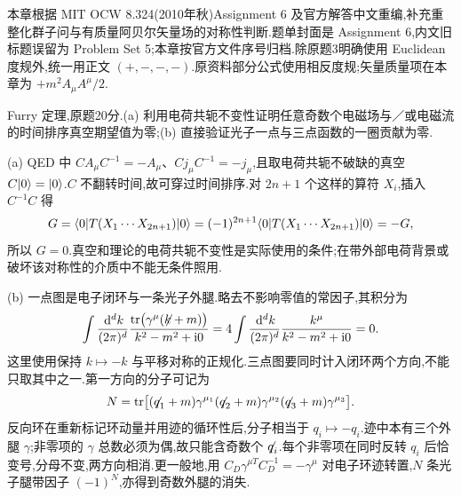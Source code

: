 本章根据 MIT OCW 8.324(2010年秋)Assignment 6 及官方解答中文重编,补充重整化群子问与有质量阿贝尔矢量场的对称性判断.题单封面是 Assignment 6,内文旧标题误留为 Problem Set 5;本章按官方文件序号归档.除原题3明确使用 Euclidean 度规外,统一用正文 $(+,-,-,-)$.原资料部分公式使用相反度规;矢量质量项在本章为 $+m^2A_\mu A^\mu/2$.

\begin{exercise}
Furry 定理,原题20分.(a) 利用电荷共轭不变性证明任意奇数个电磁场与／或电磁流的时间排序真空期望值为零;(b) 直接验证光子一点与三点函数的一圈贡献为零.
\end{exercise}
\begin{solution}
(a) QED 中 $CA_\mu C^{-1}=-A_\mu$、$Cj_\mu C^{-1}=-j_\mu$,且取电荷共轭不破缺的真空 $C\ket0=\ket0$.$C$ 不翻转时间,故可穿过时间排序.对 $2n+1$ 个这样的算符 $X_i$,插入 $C^{-1}C$ 得
\[
G=\bra0T(X_1\cdots X_{2n+1})\ket0
=(-1)^{2n+1}\bra0T(X_1\cdots X_{2n+1})\ket0=-G,
\]
所以 $G=0$.真空和理论的电荷共轭不变性是实际使用的条件;在带外部电荷背景或破坏该对称性的介质中不能无条件照用.

(b) 一点图是电子闭环与一条光子外腿.略去不影响零值的常因子,其积分为
\[
\int\frac{\dd^dk}{(2\pi)^d}
\frac{\tr\bigl(\gamma^\mu(\slashed k+m)\bigr)}{k^2-m^2+\ii0}
=4\int\frac{\dd^dk}{(2\pi)^d}\frac{k^\mu}{k^2-m^2+\ii0}=0.
\]
这里使用保持 $k\mapsto-k$ 与平移对称的正规化.三点图要同时计入闭环两个方向,不能只取其中之一.第一方向的分子可记为
\[
N=\tr\bigl[(\slashed q_1+m)\gamma^{\mu_1}
(\slashed q_2+m)\gamma^{\mu_2}(\slashed q_3+m)\gamma^{\mu_3}\bigr].
\]
反向环在重新标记环动量并用迹的循环性后,分子相当于 $q_i\mapsto-q_i$.迹中本有三个外腿 $\gamma$;非零项的 $\gamma$ 总数必须为偶,故只能含奇数个 $\slashed q_i$.每个非零项在同时反转 $q_i$ 后恰变号,分母不变,两方向相消.更一般地,用 $C_D\gamma^{\mu T}C_D^{-1}=-\gamma^\mu$ 对电子环迹转置,$N$ 条光子腿带因子 $(-1)^N$,亦得到奇数外腿的消失.
\end{solution}

